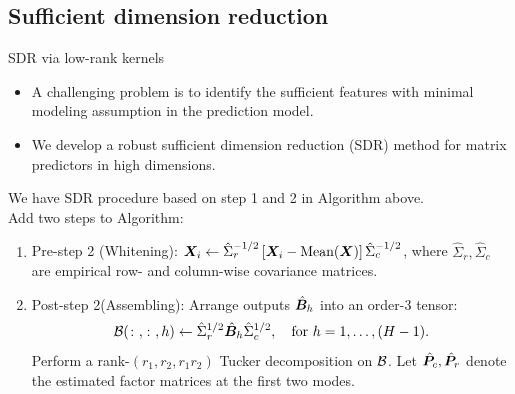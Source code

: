\documentclass[compress,dvipsnames]{beamer}
\let\olditem\item
\renewcommand\item{\olditem\justifying}
\begin{document}
\subsection{Sufficient dimension reduction}
\begin{frame}{SDR via low-rank kernels}
\begin{itemize}
\item A challenging problem is to identify the {\color{red}sufficient features} with minimal modeling assumption in the prediction model. 
\item We develop a robust sufficient dimension reduction (SDR) method for matrix predictors in high dimensions. 
\end{itemize}

\vspace{.5cm}
We have SDR procedure based on  step 1 and 2 in Algorithm above.\\
Add two steps to Algorithm: 
\begin{enumerate}
\item Pre-step 2 (Whitening): $\bm{X}_i \leftarrow \hat \Sigma^{-1/2}_{r}\left[\bm{X}_i-\text{Mean}(\bm{X})\right]\hat \Sigma^{-1/2}_{c}$, where $\hat \Sigma_{r}, \hat \Sigma_{c}$ are empirical row- and column-wise covariance matrices.
\item Post-step 2(Assembling): Arrange outputs $\hat {\bm{B}}_h$ into an order-3 tensor:
\[
{\mathcal B}(\colon,\colon,h) \leftarrow \hat \Sigma^{1/2}_{r} \hat {\bm{B}}_h \hat \Sigma^{1/2}_{c},\quad \text{for }h=1,\ldots,(H-1).
\]
Perform a rank-$(r_1,r_2,r_1r_2)$ Tucker decomposition on ${\mathcal B}$. Let $\hat {\bm{P}}_c, \hat {\bm{P}}_r$ denote the estimated factor matrices at the first two modes. 
\end{enumerate}
\end{frame}
\end{document}
